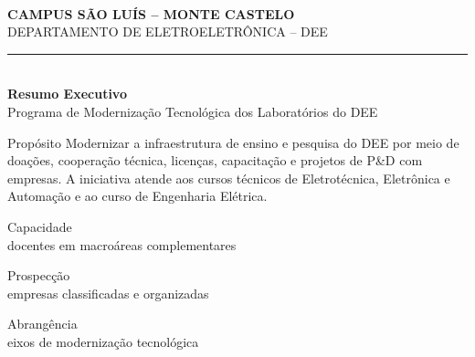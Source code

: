 \documentclass[11pt,a4paper]{article}
\begin{document}
\begin{center}
\scalebox{0.82}{\marcaIFMA}\\[1.5mm]
{\sffamily\small\bfseries\color{cinzaescuro} CAMPUS SÃO LUÍS -- MONTE CASTELO}\\[0.7mm]
{\sffamily\footnotesize\color{cinzamedio} DEPARTAMENTO DE ELETROELETRÔNICA -- DEE}\\[2mm]
{\color{ambar!85}\rule{0.62\textwidth}{0.8pt}}\\[2.5mm]
{\sffamily\LARGE\bfseries\color{azulpetroleo} Resumo Executivo}\\[1mm]
{\sffamily\large\color{cinzaescuro} Programa de Modernização Tecnológica dos Laboratórios do DEE}
\end{center}

\vspace{1mm}
\begin{resumobox}{Propósito}
Modernizar a infraestrutura de ensino e pesquisa do DEE por meio de doações, cooperação técnica, licenças, capacitação e projetos de P\&D com empresas. A iniciativa atende aos cursos técnicos de Eletrotécnica, Eletrônica e Automação e ao curso de Engenharia Elétrica.
\end{resumobox}

\begin{tcbraster}[raster columns=3, raster equal height=rows,
                  raster column skip=2.5mm, raster left skip=0pt, raster right skip=0pt]
\begin{resumobox}{Capacidade}
\\[-0.5mm]
{\small docentes em macroáreas complementares}
\end{resumobox}
\begin{resumobox}{Prospecção}
\\[-0.5mm]
{\small empresas classificadas e organizadas}
\end{resumobox}
\begin{resumobox}{Abrangência}
\\[-0.5mm]
{\small eixos de modernização tecnológica}
\end{resumobox}
\end{tcbraster}
\end{document}
